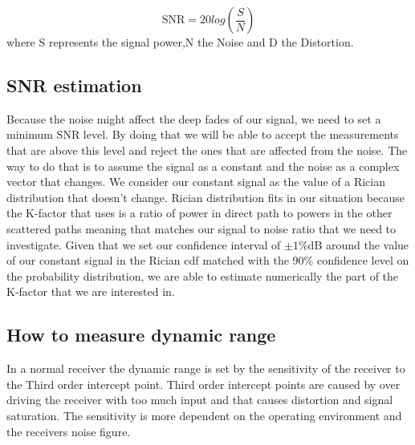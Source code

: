 \begin{equation}
\text{SNR} = 20log\left(\frac{S}{N}\right)
\end{equation}
where S represents the signal power,N the Noise and D the Distortion.\citep{SINADandSNR}
\subsection{SNR estimation}

Because the noise might affect the deep fades of our signal, we need to set a minimum SNR level. By doing that we will be able to accept the measurements that are above this level and reject the ones that are affected from the noise. The way to do that is to assume the signal as a constant and the noise as a complex vector that changes.  We consider our constant signal as the value of a Rician distribution that doesn't change. Rician distribution fits in our situation because the K-factor that uses is a ratio of power in direct path to powers in the other scattered paths\citep{SpaceWirelessChan} meaning that matches our signal to noise ratio that we need to investigate. Given that we set our confidence interval of $\pm 1\%$dB around the value of our constant signal in the Rician cdf matched with the 90\% confidence level on the probability distribution, we are able to estimate numerically the part of the K-factor that we are interested in.

\subsection{How to measure dynamic range}

In a normal receiver the dynamic range is set by the sensitivity of the receiver to the Third order intercept point. Third order intercept points are caused by over driving the receiver with too much input and that causes distortion and signal saturation. The sensitivity is more dependent on the operating environment and the receivers noise figure. \citep{understandDynamic}



